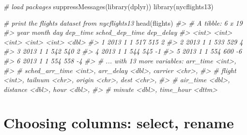 \documentclass[
]{book}
\newenvironment{Shaded}{\begin{snugshade}}{\end{snugshade}}
\newcommand{\CommentTok}[1]{\textcolor[rgb]{0.56,0.35,0.01}{\textit{#1}}}
\newcommand{\FunctionTok}[1]{\textcolor[rgb]{0.00,0.00,0.00}{#1}}
\newcommand{\NormalTok}[1]{#1}
\begin{document}
\begin{Shaded}
\begin{Highlighting}[]
\CommentTok{\# load packages}
\FunctionTok{suppressMessages}\NormalTok{(}\FunctionTok{library}\NormalTok{(dplyr))}
\FunctionTok{library}\NormalTok{(nycflights13)}

\CommentTok{\# print the flights dataset from nycflights13}
\FunctionTok{head}\NormalTok{(flights)}
\CommentTok{\#\textgreater{} \# A tibble: 6 x 19}
\CommentTok{\#\textgreater{}    year month   day dep\_time sched\_dep\_time dep\_delay}
\CommentTok{\#\textgreater{}   \textless{}int\textgreater{} \textless{}int\textgreater{} \textless{}int\textgreater{}    \textless{}int\textgreater{}          \textless{}int\textgreater{}     \textless{}dbl\textgreater{}}
\CommentTok{\#\textgreater{} 1  2013     1     1      517            515         2}
\CommentTok{\#\textgreater{} 2  2013     1     1      533            529         4}
\CommentTok{\#\textgreater{} 3  2013     1     1      542            540         2}
\CommentTok{\#\textgreater{} 4  2013     1     1      544            545        {-}1}
\CommentTok{\#\textgreater{} 5  2013     1     1      554            600        {-}6}
\CommentTok{\#\textgreater{} 6  2013     1     1      554            558        {-}4}
\CommentTok{\#\textgreater{} \# ... with 13 more variables: arr\_time \textless{}int\textgreater{},}
\CommentTok{\#\textgreater{} \#   sched\_arr\_time \textless{}int\textgreater{}, arr\_delay \textless{}dbl\textgreater{}, carrier \textless{}chr\textgreater{},}
\CommentTok{\#\textgreater{} \#   flight \textless{}int\textgreater{}, tailnum \textless{}chr\textgreater{}, origin \textless{}chr\textgreater{}, dest \textless{}chr\textgreater{},}
\CommentTok{\#\textgreater{} \#   air\_time \textless{}dbl\textgreater{}, distance \textless{}dbl\textgreater{}, hour \textless{}dbl\textgreater{},}
\CommentTok{\#\textgreater{} \#   minute \textless{}dbl\textgreater{}, time\_hour \textless{}dttm\textgreater{}}
\end{Highlighting}
\end{Shaded}

\hypertarget{choosing-columns-select-rename}{%
\section{Choosing columns: select, rename}\label{choosing-columns-select-rename}}
\end{document}
